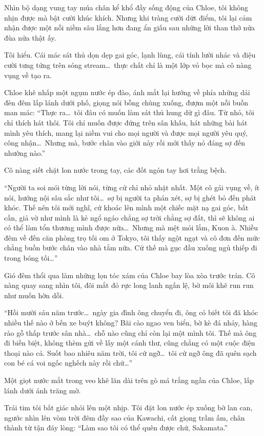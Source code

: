 \documentclass[../main.tex]{subfiles}
\begin{document}
Nhìn bộ dạng vung tay múa chân kể khổ đầy sống động của Chloe, tôi không nhịn được mà bật cười khúc khích. Nhưng khi tràng cười dứt điểm, tôi lại cảm nhận được một nỗi niềm sâu lắng hơn đang ẩn giấu sau những lời than thở nửa đùa nửa thật ấy.

Tôi hiểu. Cái mác sát thủ dọn dẹp gai góc, lạnh lùng, cái tính lười nhác và điệu cười tưng tửng trên sóng stream\dots\ thực chất chỉ là một lớp vỏ bọc mà cô nàng vụng về tạo ra.

Chloe khẽ nhấp một ngụm nước ép đào, ánh mắt lại hướng về phía những dải đèn đêm lấp lánh dưới phố, giọng nói bỗng chùng xuống, đượm một nỗi buồn man mác: ``Thực ra\dots\ tôi đâu có muốn làm sát thủ hung dữ gì đâu. Từ nhỏ, tôi chỉ thích hát thôi. Tôi chỉ muốn được đứng trên sân khấu, hát những bài hát mình yêu thích, mang lại niềm vui cho mọi người và được mọi người yêu quý, công nhận\dots\ Nhưng mà, bước chân vào giới này rồi mới thấy nó đáng sợ đến nhường nào.''

Cô nàng siết chặt lon nước trong tay, các đốt ngón tay hơi trắng bệch.

``Người ta soi mói từng lời nói, từng cử chỉ nhỏ nhặt nhất. Một cô gái vụng về, ít nói, hướng nội sâu sắc như tôi\dots\ sợ bị người ta phán xét, sợ bị ghét bỏ đến phát khóc. Thế nên tôi mới nghĩ, cứ khoác lên mình một chiếc mặt nạ gai góc, bất cần, giả vờ như mình là kẻ ngổ ngáo chẳng sợ trời chẳng sợ đất, thì sẽ không ai có thể làm tổn thương mình được nữa\dots\ Nhưng mà mệt mỏi lắm, Kuon à. Nhiều đêm về đến căn phòng trọ tối om ở Tokyo, tôi thấy ngột ngạt và cô đơn đến mức chẳng buồn bước chân vào nhà tắm nữa. Cứ thế mà gục đầu xuống ngủ thiếp đi trong bóng tối\dots''

Gió đêm thổi qua làm những lọn tóc xám của Chloe bay lòa xòa trước trán. Cô nàng quay sang nhìn tôi, đôi mắt đỏ rực long lanh ngấn lệ, bờ môi khẽ run run như muốn hờn dỗi.

``Hồi mười sáu năm trước\dots\ ngày gia đình ông chuyển đi, ông có biết tôi đã khóc nhiều thế nào ở bến xe buýt không? Bãi cào ngao ven biển, bờ kè đá nhảy, hàng rào gỗ thấp trước sân nhà\dots\ chỗ nào cũng chỉ còn lại một mình tôi. Thế mà ông đi biền biệt, không thèm gửi về lấy một cánh thư, cũng chẳng có một cuộc điện thoại nào cả. Suốt bao nhiêu năm trời, tôi cứ ngỡ\dots\ tôi cứ ngỡ ông đã quên sạch con bé cá voi ngốc nghếch này rồi chứ\dots''

Một giọt nước mắt trong veo khẽ lăn dài trên gò má trắng ngần của Chloe, lấp lánh dưới ánh trăng mờ.

Trái tim tôi bất giác nhói lên một nhịp. Tôi đặt lon nước ép xuống bờ lan can, ngước nhìn lên vòm trời đêm đầy sao của Kawachi, cất giọng trầm ấm, chân thành từ tận đáy lòng: ``Làm sao tôi có thể quên được chứ, Sakamata.''
\end{document}
